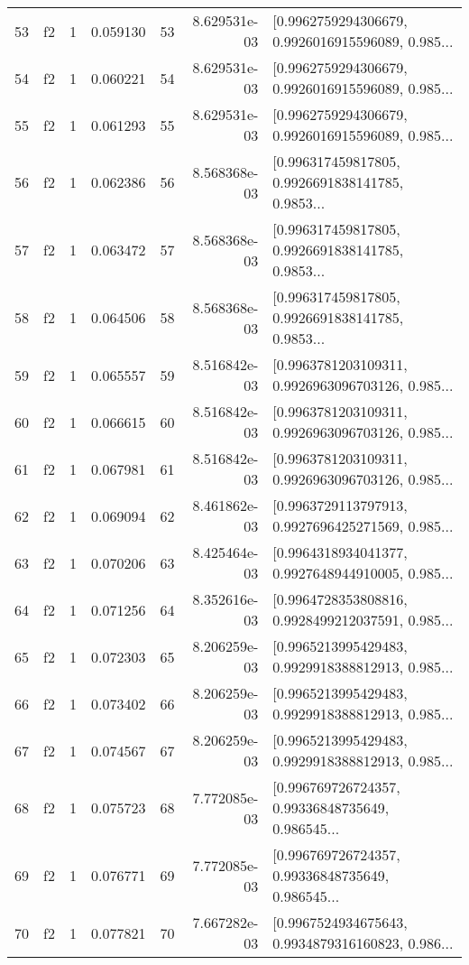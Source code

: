 \begin{tabular}{lllrlrl}
53  &  f2 &   1 &  0.059130 &   53 &  8.629531e-03 &  [0.9962759294306679, 0.9926016915596089, 0.985... \\
54  &  f2 &   1 &  0.060221 &   54 &  8.629531e-03 &  [0.9962759294306679, 0.9926016915596089, 0.985... \\
55  &  f2 &   1 &  0.061293 &   55 &  8.629531e-03 &  [0.9962759294306679, 0.9926016915596089, 0.985... \\
56  &  f2 &   1 &  0.062386 &   56 &  8.568368e-03 &  [0.996317459817805, 0.9926691838141785, 0.9853... \\
57  &  f2 &   1 &  0.063472 &   57 &  8.568368e-03 &  [0.996317459817805, 0.9926691838141785, 0.9853... \\
58  &  f2 &   1 &  0.064506 &   58 &  8.568368e-03 &  [0.996317459817805, 0.9926691838141785, 0.9853... \\
59  &  f2 &   1 &  0.065557 &   59 &  8.516842e-03 &  [0.9963781203109311, 0.9926963096703126, 0.985... \\
60  &  f2 &   1 &  0.066615 &   60 &  8.516842e-03 &  [0.9963781203109311, 0.9926963096703126, 0.985... \\
61  &  f2 &   1 &  0.067981 &   61 &  8.516842e-03 &  [0.9963781203109311, 0.9926963096703126, 0.985... \\
62  &  f2 &   1 &  0.069094 &   62 &  8.461862e-03 &  [0.9963729113797913, 0.9927696425271569, 0.985... \\
63  &  f2 &   1 &  0.070206 &   63 &  8.425464e-03 &  [0.9964318934041377, 0.9927648944910005, 0.985... \\
64  &  f2 &   1 &  0.071256 &   64 &  8.352616e-03 &  [0.9964728353808816, 0.9928499212037591, 0.985... \\
65  &  f2 &   1 &  0.072303 &   65 &  8.206259e-03 &  [0.9965213995429483, 0.9929918388812913, 0.985... \\
66  &  f2 &   1 &  0.073402 &   66 &  8.206259e-03 &  [0.9965213995429483, 0.9929918388812913, 0.985... \\
67  &  f2 &   1 &  0.074567 &   67 &  8.206259e-03 &  [0.9965213995429483, 0.9929918388812913, 0.985... \\
68  &  f2 &   1 &  0.075723 &   68 &  7.772085e-03 &  [0.996769726724357, 0.99336848735649, 0.986545... \\
69  &  f2 &   1 &  0.076771 &   69 &  7.772085e-03 &  [0.996769726724357, 0.99336848735649, 0.986545... \\
70  &  f2 &   1 &  0.077821 &   70 &  7.667282e-03 &  [0.9967524934675643, 0.9934879316160823, 0.986... \\

\end{tabular}
